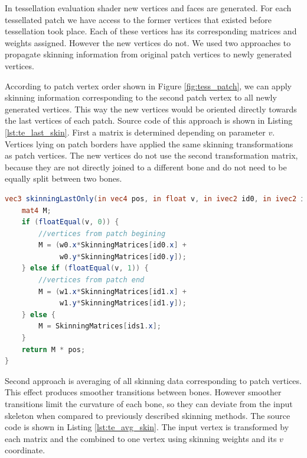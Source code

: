 In tessellation evaluation shader new vertices and faces are generated.
For each tessellated patch we have access to the former vertices that existed before tessellation took place.
Each of these vertices has its corresponding matrices and weights assigned.
However the new vertices do not.
We used two approaches to propagate skinning information from original patch vertices to newly generated vertices.

According to patch vertex order shown in Figure \ref{fig:tess_patch}, we can apply skinning information corresponding to the second patch vertex to all newly generated vertices.
This way the new vertices would be oriented directly towards the last vertices of each patch.
Source code of this approach is shown in Listing \ref{lst:te_last_skin}.
First a matrix is determined depending on parameter $v$.
Vertices lying on patch borders have applied the same skinning transformations as patch vertices.
The new vertices do not use the second transformation matrix, because they are not directly joined to a different bone and do not need to be equally split between two bones.

\linespread{1.2}
\begin{lstlisting}[language=GLSL,caption={Linear Blend Skinning implemented in tessellation evaluation shader, using only skinning information from the first patch vertex.},label={lst:te_last_skin}]
vec3 skinningLastOnly(in vec4 pos, in float v, in ivec2 id0, in ivec2 id1, in vec2 w0, in vec2 w1, in mat4 SkinningMatrices[SKINNING_MATRICES]) {
	mat4 M;
	if (floatEqual(v, 0)) {
		//vertices from patch begining
		M = (w0.x*SkinningMatrices[id0.x] +
			 w0.y*SkinningMatrices[id0.y]);
	} else if (floatEqual(v, 1)) {
		//vertices from patch end
		M = (w1.x*SkinningMatrices[id1.x] +
			 w1.y*SkinningMatrices[id1.y]);
	} else {
		M = SkinningMatrices[ids1.x];
	}
	return M * pos;
}
\end{lstlisting} 
\linespread{1.5}

Second approach is averaging of all skinning data corresponding to patch vertices.
This effect produces smoother transitions between bones.
However smoother transitions limit the curvature of each bone, so they can deviate from the input skeleton when compared to previously described skinning methods.
The source code is shown in Listing \ref{lst:te_avg_skin}.
The input vertex is transformed by each matrix and the combined to one vertex using skinning weights and its $v$ coordinate.

